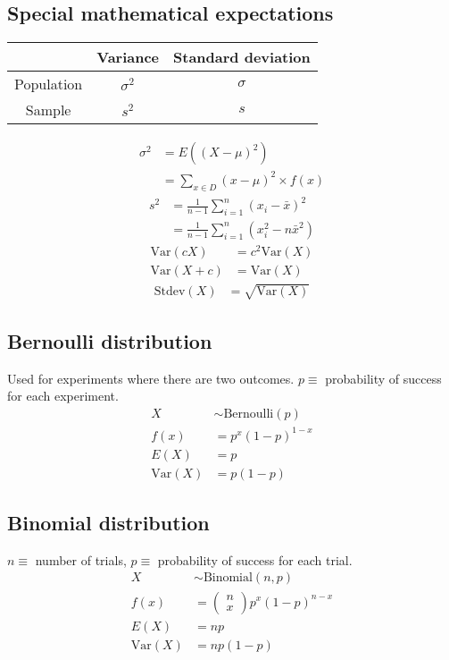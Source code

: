 \documentclass{article}
\newcommand{\var}{\text{Var}}
\newcommand{\bernoulli}{\text{Bernoulli}}
\newcommand{\binomial}{\text{Binomial}}
\newcommand{\stdev}{\text{Stdev}}
\begin{document}
\begin{multicols*}{2}
\subsection{Special mathematical expectations}
\begin{center}
    \begin{tabular}{|c|c|c|}
        \hline
        & Variance & Standard deviation \\ \hline
        Population & $\sigma^2$ & $\sigma$ \\ \hline
        Sample & $s^2$ & $s$ \\ \hline
    \end{tabular}
\end{center}

\begin{align*}
    \sigma^2 &= E((X - \mu)^2) \\
    &= \sum_{x \in D} (x - \mu)^2 \times f(x)
\end{align*}
\begin{align*}
    s^2 &= \frac{1}{n - 1} \sum_{i = 1}^n (x_i - \bar{x})^2 \\
    &= \frac{1}{n - 1} \sum_{i = 1}^n (x_i^2 - n\bar{x}^2)
\end{align*}
\begin{align*}
    \var(cX) &= c^2 \var(X) \\
    \var(X + c) &= \var(X)
\end{align*}
\begin{align*}
    \stdev(X) &= \sqrt{\var(X)}
\end{align*}

\subsection{Bernoulli distribution}

Used for experiments where there are two outcomes. $p \equiv$ probability of success for each experiment.
\begin{align*}
    X &\sim \bernoulli(p) \\
    f(x) &= p^x (1-p)^{1-x} \\
    E(X) &= p \\
    \var(X) &= p(1-p)
\end{align*}

\subsection{Binomial distribution}
$n \equiv$ number of trials, $p \equiv$ probability of success for each trial.
\begin{align*}
    X &\sim \binomial(n, p) \\
    f(x) &= \begin{pmatrix}
        n \\
        x
    \end{pmatrix} p^x (1-p)^{n-x} \\
    E(X) &= np \\
    \var(X) &= np(1-p)
\end{align*}


\end{multicols*}
\end{document}
